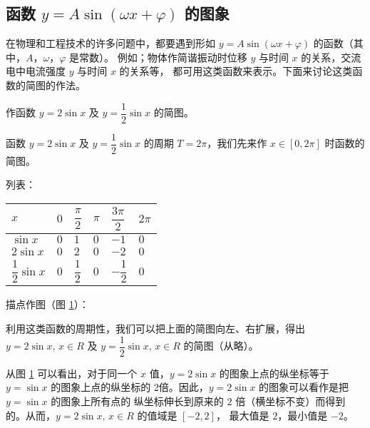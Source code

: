 \subsection{函数 \texorpdfstring{$y = A \sin(\omega x + \varphi)$}{y=A sin(o x+ v)} 的图象}\label{subsec:2-9}

在物理和工程技术的许多问题中，都要遇到形如 $y = A \sin(\omega x + \varphi)$ 的函数（其中，$A$，$\omega$，$\varphi$ 是常数）。
例如；物体作简谐振动时位移 $y$ 与时间 $x$ 的关系，交流电中电流强度 $y$ 与时间 $x$ 的关系等，
都可用这类函数来表示。下面来讨论这类函数的简图的作法。

\vspace{0.5em}
\liti 作函数 $y = 2\sin x$ 及 $y = \dfrac 1 2 \sin x$ 的简图。
\vspace{0.5em}

\jie 函数 $y = 2\sin x$ 及 $y = \dfrac 1 2 \sin x$ 的周期 $T = 2\pi$，我们先来作 $x \in [0, 2\pi]$ 时函数的简图。

列表：

\begin{table}[H]
\renewcommand\arraystretch{2}
\begin{tabular}{|w{c}{8em}|*{5}{w{c}{3em}|}}
    \hline
    $x$ & $0$ & $\dfrac \pi 2$ & $\pi$ & $\dfrac{3\pi}{2}$ & $2\pi$ \\ \hline
    $\sin x$ & $0$ & $1$ & $0$ & $-1$ & $0$ \\ \hline
    $2\sin x$ & $0$ & $2$ & $0$ & $-2$ & $0$ \\ \hline
    $\dfrac 1 2 \sin x$ & $0$ & $\dfrac 1 2$ & $0$ & $-\dfrac 1 2$ & $0$ \\ \hline
\end{tabular}
\end{table}

描点作图（图 \ref{fig:2-23}）：

\begin{figure}[htbp]
    \centering
    
    \caption{}\label{fig:2-23}
\end{figure}

利用这类函数的周期性，我们可以把上面的简图向左、右扩展，得出 $y = 2\sin x, \, x \in R$ 及 $y = \dfrac 1 2\sin x, \, x \in R$ 的简图（从略）。
\vspace{0.5em}

从图 \ref{fig:2-23} 可以看出，对于同一个 $x$ 值，$y = 2\sin x$ 的图象上点的纵坐标等于 $y = \sin x$
的图象上点的纵坐标的 $2$倍。因此，$y = 2\sin x$ 的图象可以看作是把 $y = \sin x$ 的图象上所有点的
纵坐标伸长到原来的 $2$ 倍（横坐标不变）而得到的。从而，$y = 2\sin x, \, x \in R$ 的值域是 $[-2, 2]$，
最大值是 $2$，最小值是 $-2$。

